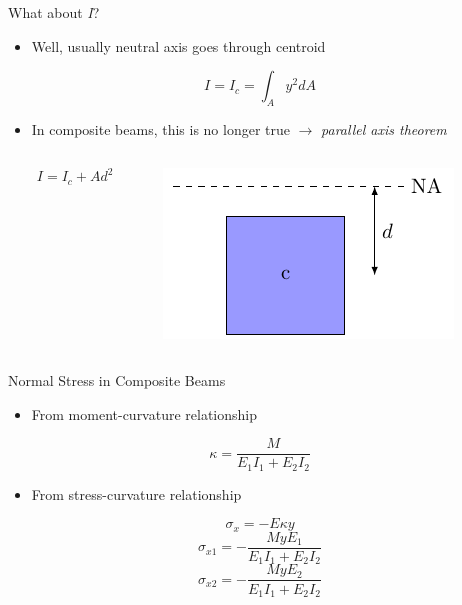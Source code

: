 \documentclass[10pt, svgnames]{beamer}
\begin{document}
\begin{frame}[label={sec:org4ccc3d4}]{What about \emph{I}?}
\begin{itemize}
\item Well, usually neutral axis goes through centroid
\end{itemize}

\[I = I_c = \int_A y^2 dA\]

\begin{itemize}
\item In composite beams, this is no longer true \(\rightarrow\) \emph{parallel
axis theorem}
\end{itemize}

\begin{columns}
\begin{column}{0.5\columnwidth}
\[I = I_c + Ad^2\]
\end{column}

\begin{column}{0.5\columnwidth}
\begin{center}
\includegraphics[width=.9\linewidth]{./pictures/parallel-axis.pdf}
\end{center}
\end{column}
\end{columns}
\end{frame}

\begin{frame}[label={sec:orge43488f}]{Normal Stress in Composite Beams}
\begin{itemize}
\item From moment-curvature relationship
\end{itemize}

\[\kappa = \frac{M}{E_1 I_1 + E_2 I_2}\]

\begin{itemize}
\item From stress-curvature relationship
\end{itemize}

\[\sigma_x = - E \kappa y\]
\[\sigma_{x1} = - \frac{MyE_1}{E_1 I_1 + E_2 I_2}\]
\[\sigma_{x2} = - \frac{MyE_2}{E_1 I_1 + E_2 I_2}\]
\end{frame}
\end{document}

